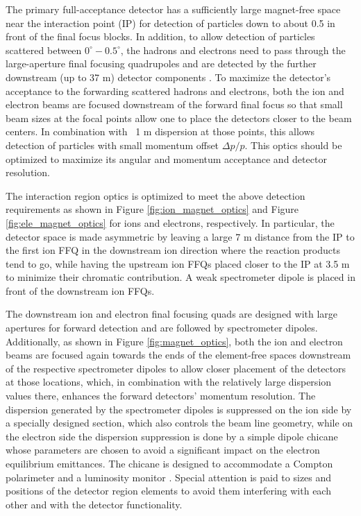 The primary full-acceptance detector has a sufficiently large magnet-free space near the interaction point (IP) for detection of particles down to about 0.5 in front of the final focus blocks. In addition, to allow detection of particles scattered between $0^{\circ}-0.5^{\circ}$, the hadrons and electrons need to pass through the large-aperture final focusing quadrupoles and are detected by the further downstream (up to 37 m) detector components \cite{Abeyratne:2012ah} \cite{Abeyratne:2015pma}  \cite{Lin} \cite{Morozov:2012} \cite{Morozov:2014}. 
To maximize the detector’s acceptance to the forwarding scattered hadrons and electrons, both the ion and electron beams are focused downstream of the forward final focus so that small beam sizes at the focal points allow one to place the detectors closer to the beam centers. In combination with ~1 m dispersion at those points, this allows detection of particles with small momentum offset $\Delta p/p$. This optics should be optimized to maximize its angular and momentum acceptance and detector resolution. 

The interaction region optics is optimized to meet the above detection requirements as shown in Figure \ref{fig:ion_magnet_optics} and Figure \ref{fig:ele_magnet_optics} for ions and electrons, respectively. In particular, the detector space is made asymmetric by leaving a large 7 m distance from the IP to the first ion FFQ in the downstream ion direction where the reaction products tend to go, while having the upstream ion FFQs placed closer to the IP at 3.5 m to minimize their chromatic contribution. A weak spectrometer dipole is placed in front of the downstream ion FFQs.

The downstream ion and electron final focusing quads are designed with large apertures for forward detection and are followed by spectrometer dipoles. Additionally, as shown in Figure \ref{fig:magnet_optics}, both the ion and electron beams are focused again towards the ends of the element-free spaces downstream of the respective spectrometer dipoles to allow closer placement of the detectors at those locations, which, in combination with the relatively large dispersion values there, enhances the forward detectors’ momentum resolution. The dispersion generated by the spectrometer dipoles is suppressed on the ion side by a specially designed section, which also controls the beam line geometry, while on the electron side the dispersion suppression is done by a simple dipole chicane whose parameters are chosen to avoid a significant impact on the electron equilibrium emittances. The chicane is designed to accommodate a Compton polarimeter and a luminosity monitor \cite{Morozov:2014}.  Special attention is paid to sizes and positions of the detector region elements to avoid them interfering with each other and with the detector functionality. 

